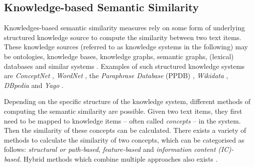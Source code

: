 \documentclass[11pt]{scrreprt}
\let\cite\parencite  %
\begin{document}
\subsection{Knowledge-based Semantic Similarity}
Knowledges-based semantic similarity measures rely on some form of underlying structured knowledge source to compute the similarity between two text items. These knowledge sources (referred to as knowledge systems in the following) may be ontologies, knowledge bases, knowledge graphs, semantic graphs, (lexical) databases and similar systems \cite{chandrasekaranEvolutionSemanticSimilarity2021, harispeSemanticSimilarityNatural2015}. Examples of such structured knowledge systems are \textit{ConceptNet} \cite{speerConceptNetOpenMultilingual2017}, \textit{WordNet} \cite{millerWordNetLexicalDatabase1995}, the \textit{Paraphrase Database} (PPDB) \cite{ganitkevitchPPDBParaphraseDatabase2013}, \textit{Wikidata} \cite{vrandecicWikidataFreeCollaborative2014}, \textit{DBpedia} \cite{auerDBpediaNucleusWeb2007} and \textit{Yago} \cite{suchanekYagoCoreSemantic2007}.


Depending on the specific structure of the knowledge system, different methods of computing the semantic similarity are possible. Given two text items, they first need to be mapped to knowledge items -- often called \textit{concepts} -- in the system. Then the similarity of these concepts can be calculated. There exists a variety of methods to calculate the similarity of two concepts, which can be categorised as follows: \textit{structural or path-based}, \textit{feature-based} and \textit{information content (IC)-based}. Hybrid methods which combine multiple approaches also exists \cite{chandrasekaranEvolutionSemanticSimilarity2021, harispeSemanticSimilarityNatural2015}. 
\end{document}
